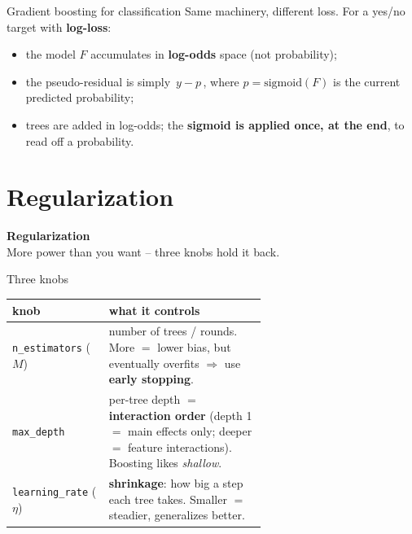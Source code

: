 \documentclass[aspectratio=169]{beamer}
\newcommand{\sectiontransition}[2]{%
  \begin{frame}[plain]
    \vfill
    \begin{center}
      {\Large\color{popblue}\textbf{#1}}\\[10pt]
      {\normalsize #2}
    \end{center}
    \vfill
  \end{frame}}
\begin{document}
\begin{frame}{Gradient boosting for classification}
  Same machinery, different loss. For a yes/no target with \textbf{log-loss}:
  \begin{itemize}\small
    \item the model $F$ accumulates in \textbf{log-odds} space (not probability);
    \item the pseudo-residual is simply $\,\textbf{$y - p$}\,$, where $p = \text{sigmoid}(F)$
      is the current predicted probability;
    \item trees are added in log-odds; the \textbf{sigmoid is applied once, at the end},
      to read off a probability.
  \end{itemize}
  \vfill
\end{frame}

\section{Regularization}
\sectiontransition{Regularization}{More power than you want -- three knobs hold it back.}

\begin{frame}{Three knobs}
  \begin{center}\footnotesize
    \renewcommand{\arraystretch}{1.25}
    \begin{tabular}{l p{0.62\linewidth}}
      knob & what it controls \\
      \hline
      \texttt{n\_estimators} ($M$) & number of trees / rounds. More $=$ lower bias, but
        eventually overfits $\Rightarrow$ use \textbf{early stopping}. \\
      \texttt{max\_depth} & per-tree depth $=$ \textbf{interaction order} (depth 1 $=$ main
        effects only; deeper $=$ feature interactions). Boosting likes \emph{shallow}. \\
      \texttt{learning\_rate} ($\eta$) & \textbf{shrinkage}: how big a step each tree takes.
        Smaller $=$ steadier, generalizes better. \\
      \hline
    \end{tabular}
  \end{center}
  \vfill
\end{frame}
\end{document}
